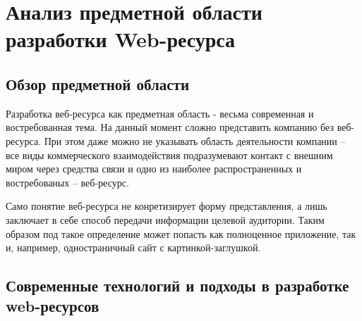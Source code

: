 \section{Анализ предметной области разработки Web-ресурса}
\subsection{Обзор предметной области}
    Разработка веб-ресурса как предметная область - весьма современная и востребованная тема.
    На данный момент сложно представить компанию без веб-ресурса.
    При этом даже можно не указывать область деятельности компании -- все виды коммерческого взаимодействия подразумевают контакт с внешним миром через средства связи и одно из наиболее распространенных и востребованых -- веб-ресурс.
    
    Само понятие веб-ресурса не конретизирует форму представления, а лишь заключает в себе способ передачи информации целевой аудитории.
    Таким образом под такое определение может попасть как полноценное приложение, так и, например, одностраничный сайт с картинкой-заглушкой.


\subsection{Современные технологий и подходы в разработке web-ресурсов}
